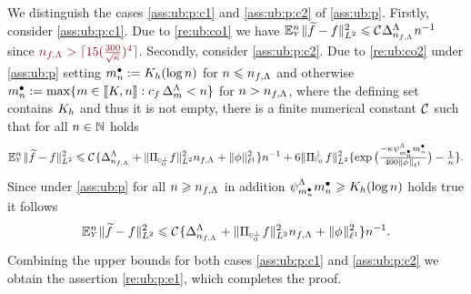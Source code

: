 \begin{pro}
We distinguish the cases
  \ref{ass:ub:p:c1} and \ref{ass:ub:p:c2} of \cref{ass:ub:p}. Firstly, consider \ref{ass:ub:p:c1}. Due to \cref{re:ub:co1} we have 
$\FuEx[\ssY]{\rY}\VnormLp{\txdfPr[]-\xdf}^2\leq\cst{}\DipenSv[\ssY_{\xdf,\iSv}]\ssY^{-1}$ since  
$\dr\ssY_{\xdf,\iSv}>\ceil{15(\tfrac{300}{\sqrt{\cpen}})^4}$. Secondly,
consider \ref{ass:ub:p:c2}. Due to \cref{re:ub:co2} under
\cref{ass:ub:p} setting $\sDi{\ssY}:=K_{\ydf}(\log
n)$ for 
 $\ssY\leq\ssY_{\xdf,\iSv}$ and otherwise 
$\sDi{\ssY}:=\max\{\Di\in\nset{K,\ssY}:c_{\xdf}\,\DipenSv<\ssY\}$ for
$\ssY>\ssY_{\xdf,\iSv}$, 
where the defining set contains $K_{\ydf}$ and thus it is not empty,
there is a finite numerical constant $\cst{}$ such that for all $\ssY\in\Nz$ holds
\begin{equation}
\FuEx[\ssY]{\rY}\VnormLp{\txdf-\xdf}^2
\leq\cst{}\{\DipenSv[\ssY_{\xdf,\iSv}]+\VnormLp{\Proj[{\mHiH[0]^\perp}]\xdf}^2\ssY_{\xdf,\iSv}+ \Vnormlp[1]{\fydf}^2\}\ssY^{-1}
+ 6\VnormLp{\Proj[{\mHiH[0]}]^\perp\xdf}^2\{ \exp\big(\tfrac{-\cpen\cmSv[\sDi{\ssY}]\sDi{\ssY}}{400\Vnormlp[1]{\fydf}}\big)-\tfrac{1}{\ssY}\}.
\end{equation}
Since under \cref{ass:ub:p} for all 
$\ssY\geq\ssY_{\xdf,\iSv}$ in addition
$\cmiSv[\sDi{\ssY}]\sDi{\ssY}\geq K_{\ydf}(\log\ssY)$  holds true it follows
\begin{equation}
\FuEx[\ssY]{\rY}\VnormLp{\txdf-\xdf}^2
\leq\cst{}\{\DipenSv[\ssY_{\xdf,\iSv}]+\VnormLp{\Proj[{\mHiH[0]^\perp}]\xdf}^2\ssY_{\xdf,\iSv}+ \Vnormlp[1]{\fydf}^2\}\ssY^{-1}.
\end{equation}
Combining the upper bounds for both cases \ref{ass:ub:p:c1} and
\ref{ass:ub:p:c2} we obtain the assertion \eqref{re:ub:p:e1}, which
completes the proof.
\end{pro}

